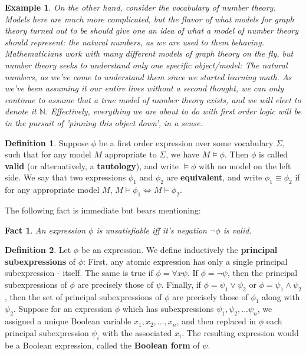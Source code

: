 \documentclass{article}
\theoremstyle{definition}
\newtheorem{definition}{Definition}[section]
\theoremstyle{plain}
\newtheorem{example}{Example}[section]
\theoremstyle{theorem}
\newtheorem{fact}{Fact}[section]
\begin{document}
\begin{example}
    On the other hand, consider the vocabulary of number theory. Models here are much more complicated, but the flavor of what models for graph theory turned out to be should give one an idea of what a model of number theory should represent: the natural numbers, as we are used to them behaving. Mathematicians work with many different models of graph theory on the fly, but number theory seeks to understand only one \textit{specific} object/model: The natural numbers, as we've come to understand them since we started learning math. As we've been assuming it our entire lives without a second thought, we can only continue to assume that a \textit{true} model of number theory exists, and we will elect to denote it $\mathbb{N}$. Effectively, everything we are about to do with first order logic will be in the pursuit of 'pinning this object down', in a sense.
\end{example}
\begin{definition}
    Suppose $\phi$ be a first order expression over some vocabulary $\Sigma$, such that for any model $M$ appropriate to  $\Sigma$, we have $M \models \phi$. Then $\phi$ is called \textbf{valid} (or alternatively, a \textbf{tautology}), and write $\models \phi$ with no model on the left side. We say that two expressions $\phi_1$ and $\phi_2$ are \textbf{equivalent}, and write $\phi_1 \equiv \phi_2$ if for any appropriate model $M$, $M \models \phi_1 \iff M \models \phi_2$. 
\end{definition}
The following fact is immediate but bears mentioning:
\begin{fact}
    An expression $\phi$ is unsatisfiable iff it's negation $\neg \phi$ is valid.
\end{fact}
\begin{definition}
    Let $\phi$ be an expression. We define inductively the \textbf{principal subexpressions} of $\phi$: First, any atomic expression has only a single principal subexpression - itself. The same is true if $\phi = \forall x \psi$. If $\phi = \neg \psi$, then the principal subexpressions of $\phi$ are precisely those of $\psi$. Finally, if $\phi = \psi_1 \vee \psi_2$ or $\phi = \psi_1 \wedge \psi_2$, then the set of principal subexpressions of $\phi$ are precisely those of $\phi_1$ along with $\psi_2$. Suppose for an expression $\phi$ which has subexpressions $\psi_1, \psi_2,... \psi_n$, we assigned a unique Boolean variable $x_1,x_2,...,x_n$, and then replaced in $\phi$ each principal subexpression $\psi_i$ with the associated $x_i$. The resulting expression would be a Boolean expression, called the \textbf{Boolean form} of $\psi$.
\end{definition}
\end{document}
